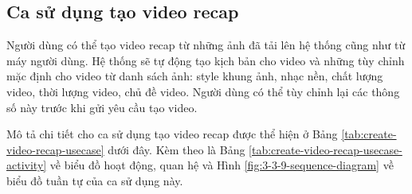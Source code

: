 \subsection{Ca sử dụng tạo video recap}

Người dùng có thể tạo video recap từ những ảnh đã tải lên hệ thống cũng như từ máy người dùng. Hệ thống sẽ tự động tạo kịch bản cho video và những tùy chỉnh mặc định cho video từ danh sách ảnh: style khung ảnh, nhạc nền, chất lượng video, thời lượng video, chủ đề video. Người dùng có thể tùy chỉnh lại các thông số này trước khi gửi yêu cầu tạo video. 

Mô tả chi tiết cho ca sử dụng tạo video recap được thể hiện ở Bảng \ref{tab:create-video-recap-usecase} dưới đây. Kèm theo là Bảng \ref{tab:create-video-recap-usecase-activity} về biểu đồ hoạt động, quan hệ và Hình \ref{fig:3-3-9-sequence-diagram} về biểu đồ tuần tự của ca sử dụng này. 

